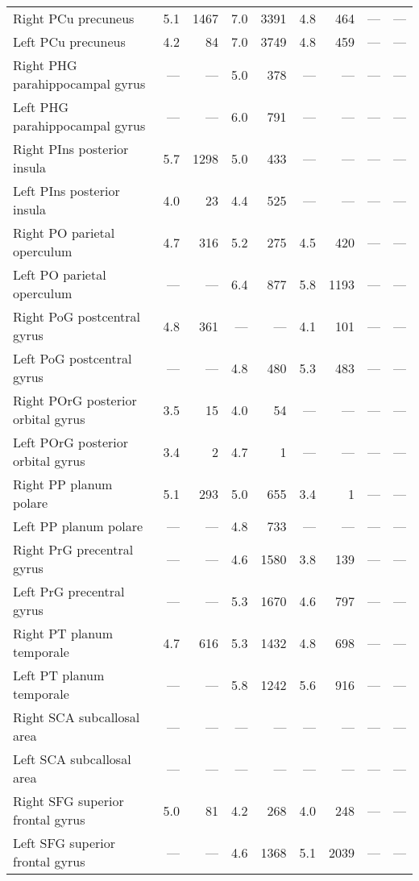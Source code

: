 \documentclass[]{article}
\begin{document}
\begin{table}[ht]
{\begin{tabular}{lrrrrrrrr}
  Right PCu   precuneus & 5.1 & 1467 & 7.0 & 3391 & 4.8 & 464 & --- & --- \\ 
  Left PCu   precuneus & 4.2 & 84 & 7.0 & 3749 & 4.8 & 459 & --- & --- \\ 
  Right PHG   parahippocampal gyrus & --- & --- & 5.0 & 378 & --- & --- & --- & --- \\ 
  Left PHG   parahippocampal gyrus & --- & --- & 6.0 & 791 & --- & --- & --- & --- \\ 
  Right PIns  posterior insula & 5.7 & 1298 & 5.0 & 433 & --- & --- & --- & --- \\ 
  Left PIns  posterior insula & 4.0 & 23 & 4.4 & 525 & --- & --- & --- & --- \\ 
  Right PO    parietal operculum & 4.7 & 316 & 5.2 & 275 & 4.5 & 420 & --- & --- \\ 
  Left PO    parietal operculum & --- & --- & 6.4 & 877 & 5.8 & 1193 & --- & --- \\ 
  Right PoG   postcentral gyrus & 4.8 & 361 & --- & --- & 4.1 & 101 & --- & --- \\ 
  Left PoG   postcentral gyrus & --- & --- & 4.8 & 480 & 5.3 & 483 & --- & --- \\ 
  Right POrG  posterior orbital gyrus & 3.5 & 15 & 4.0 & 54 & --- & --- & --- & --- \\ 
  Left POrG  posterior orbital gyrus & 3.4 & 2 & 4.7 & 1 & --- & --- & --- & --- \\ 
  Right PP    planum polare & 5.1 & 293 & 5.0 & 655 & 3.4 & 1 & --- & --- \\ 
  Left PP    planum polare & --- & --- & 4.8 & 733 & --- & --- & --- & --- \\ 
  Right PrG   precentral gyrus & --- & --- & 4.6 & 1580 & 3.8 & 139 & --- & --- \\ 
  Left PrG   precentral gyrus & --- & --- & 5.3 & 1670 & 4.6 & 797 & --- & --- \\ 
  Right PT    planum temporale & 4.7 & 616 & 5.3 & 1432 & 4.8 & 698 & --- & --- \\ 
  Left PT    planum temporale & --- & --- & 5.8 & 1242 & 5.6 & 916 & --- & --- \\ 
  Right SCA   subcallosal area & --- & --- & --- & --- & --- & --- & --- & --- \\ 
  Left SCA   subcallosal area & --- & --- & --- & --- & --- & --- & --- & --- \\ 
  Right SFG   superior frontal gyrus & 5.0 & 81 & 4.2 & 268 & 4.0 & 248 & --- & --- \\ 
  Left SFG   superior frontal gyrus & --- & --- & 4.6 & 1368 & 5.1 & 2039 & --- & --- \\ 

\end{tabular}}
\end{table}
\end{document}
